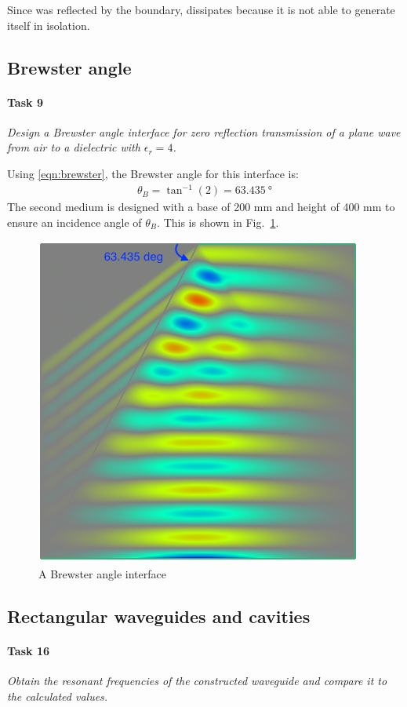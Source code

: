 Since  was reflected by the boundary,  dissipates because it is not able to generate itself in isolation.

\subsection{Brewster angle}
\paragraph{Task 9}\textit{Design a Brewster angle interface for zero reflection transmission of a plane wave from air to a dielectric with $\epsilon_r = 4$.}

Using \eqref{eqn:brewster}, the Brewster angle for this interface is:
\begin{align*}
	\theta_B = \tan^{-1}(2) = \SI{63.435}{\degree} 
\end{align*}
The second medium is designed with a base of 200 mm and height of 400 mm to ensure an incidence angle of $\theta_B$.
This is shown in Fig.~\ref{fig:Task9-Brewster}.

\begin{figure}[tbph]
	\centering
	\includegraphics[width=0.6\linewidth]{graphics/Task9-Brewster}
	\caption{A Brewster angle interface}
	\label{fig:Task9-Brewster}
\end{figure}


\pagebreak
\subsection{Rectangular waveguides and cavities}
\paragraph{Task 16}\textit{Obtain the resonant frequencies of the constructed waveguide and compare it to the calculated values.}

